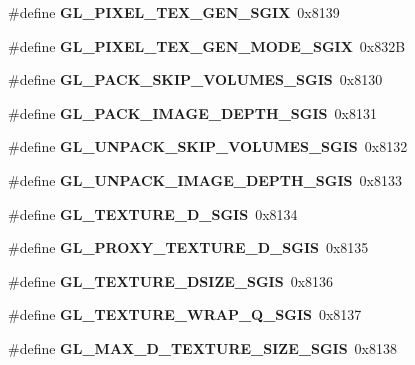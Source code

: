 \begin{DoxyCompactItemize}
\item 
\#define {\bfseries G\+L\+\_\+\+P\+I\+X\+E\+L\+\_\+\+T\+E\+X\+\_\+\+G\+E\+N\+\_\+\+S\+G\+I\+X}~0x8139\label{_s_d_l__opengl_8h_af9af0faa7e774943e2bc036fe20f18a5}

\item 
\#define {\bfseries G\+L\+\_\+\+P\+I\+X\+E\+L\+\_\+\+T\+E\+X\+\_\+\+G\+E\+N\+\_\+\+M\+O\+D\+E\+\_\+\+S\+G\+I\+X}~0x832\+B\label{_s_d_l__opengl_8h_ad9f3082667416676188d4abc78454519}

\item 
\#define {\bfseries G\+L\+\_\+\+P\+A\+C\+K\+\_\+\+S\+K\+I\+P\+\_\+\+V\+O\+L\+U\+M\+E\+S\+\_\+\+S\+G\+I\+S}~0x8130\label{_s_d_l__opengl_8h_a1af713f3fd5d45eb710c4740a807e000}

\item 
\#define {\bfseries G\+L\+\_\+\+P\+A\+C\+K\+\_\+\+I\+M\+A\+G\+E\+\_\+\+D\+E\+P\+T\+H\+\_\+\+S\+G\+I\+S}~0x8131\label{_s_d_l__opengl_8h_a9742be2da813563a2e10fda033e8838f}

\item 
\#define {\bfseries G\+L\+\_\+\+U\+N\+P\+A\+C\+K\+\_\+\+S\+K\+I\+P\+\_\+\+V\+O\+L\+U\+M\+E\+S\+\_\+\+S\+G\+I\+S}~0x8132\label{_s_d_l__opengl_8h_a824f0321b62de8184e69bad6ad814184}

\item 
\#define {\bfseries G\+L\+\_\+\+U\+N\+P\+A\+C\+K\+\_\+\+I\+M\+A\+G\+E\+\_\+\+D\+E\+P\+T\+H\+\_\+\+S\+G\+I\+S}~0x8133\label{_s_d_l__opengl_8h_aa0d7fd1b09a3aac4a7f6a3f20590a6ee}

\item 
\#define {\bfseries G\+L\+\_\+\+T\+E\+X\+T\+U\+R\+E\+\_\+D\+\_\+\+S\+G\+I\+S}~0x8134\label{_s_d_l__opengl_8h_a68f8e4e09c293cdba5e18ead644c7132}

\item 
\#define {\bfseries G\+L\+\_\+\+P\+R\+O\+X\+Y\+\_\+\+T\+E\+X\+T\+U\+R\+E\+\_\+D\+\_\+\+S\+G\+I\+S}~0x8135\label{_s_d_l__opengl_8h_a0dbb417754f62ae2e869cb5aba639ea0}

\item 
\#define {\bfseries G\+L\+\_\+\+T\+E\+X\+T\+U\+R\+E\+\_\+D\+S\+I\+Z\+E\+\_\+\+S\+G\+I\+S}~0x8136\label{_s_d_l__opengl_8h_accb6c1c52fe9a1e1f6f0282c518b2c7f}

\item 
\#define {\bfseries G\+L\+\_\+\+T\+E\+X\+T\+U\+R\+E\+\_\+\+W\+R\+A\+P\+\_\+\+Q\+\_\+\+S\+G\+I\+S}~0x8137\label{_s_d_l__opengl_8h_a3d185a9729d4aa08681d15b855651969}

\item 
\#define {\bfseries G\+L\+\_\+\+M\+A\+X\+\_\+D\+\_\+\+T\+E\+X\+T\+U\+R\+E\+\_\+\+S\+I\+Z\+E\+\_\+\+S\+G\+I\+S}~0x8138\label{_s_d_l__opengl_8h_a88045fea586e8151a4338b78501f5f5b}


\end{DoxyCompactItemize}
